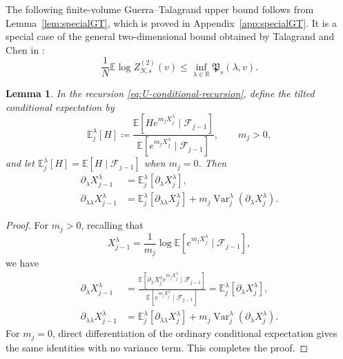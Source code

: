 \documentclass[11pt]{article}
\newtheorem{lemma}[theorem]{Lemma}
\numberwithin{equation}{section}
\newcommand{\E}{\mathbb{E}}
\newcommand{\1}{\mathbf 1}
\newcommand{\cK}{\mathcal K}
\begin{document}
The following finite-volume Guerra--Talagrand upper bound follows from Lemma~\ref{lem:specialGT}, which is proved in Appendix~\ref{app:specialGT}. It is a special case of the general two-dimensional bound obtained by Talagrand and Chen in \cite{Talagrand,ChenGT}:
\begin{equation}
 \frac1N\E\log Z^{(2)}_{N,s}(v)
 \le \inf_{\lambda\in \mathbb R} \mathfrak P_s(\lambda,v).
 \label{eq:GTfunctionalbound}
\end{equation}

\begin{lemma}
\label{lem:U-finite-step-derivatives}
In the recursion \eqref{eq:U-conditional-recursion}, define the tilted
conditional expectation by
\[
\E_j^\lambda[H]
\coloneqq
\frac{
\E\left[
H e^{m_jX_j^\lambda}\mid\mathcal F_{j-1}
\right]
}{
\E\left[
e^{m_jX_j^\lambda}\mid\mathcal F_{j-1}
\right]
},
\qquad m_j>0,
\]
and let $\E_j^\lambda[H]=\E[H\mid\mathcal F_{j-1}]$ when $m_j=0$.
Then
\begin{align}
\partial_\lambda X_{j-1}^\lambda
&=
\E_j^\lambda
\left[
\partial_\lambda X_j^\lambda
\right],
\label{eq:U-first-derivative-recursion}\\
\partial_{\lambda\lambda}X_{j-1}^\lambda
&=
\E_j^\lambda
\left[
\partial_{\lambda\lambda}X_j^\lambda
\right]
+
m_j
\operatorname{Var}_j^\lambda
\left(
\partial_\lambda X_j^\lambda
\right).
\label{eq:U-second-derivative-recursion}
\end{align}
\end{lemma}


\begin{proof}
For $m_j>0$, recalling that $$ X_{j-1}^\lambda= \displaystyle\frac1{m_j}\log\E\left[
 e^{m_jX_j^\lambda}\mid\mathcal F_{j-1}\right],$$
 we have 
\begin{align*}
 \partial_\lambda X_{j-1}^\lambda
 &=\frac{
\E\left[
\partial_\lambda X_j^\lambda e^{m_jX_j^\lambda}\mid\mathcal F_{j-1}
\right]
}{
\E\left[
e^{m_jX_j^\lambda}\mid\mathcal F_{j-1}
\right]}
= \E_j^\lambda[\partial_\lambda X_j^\lambda],\\
 \partial_{\lambda\lambda}X_{j-1}^\lambda
 &=\E_j^\lambda[\partial_{\lambda\lambda}X_j^\lambda]
   +m_j\operatorname{Var}_j^\lambda
       (\partial_\lambda X_j^\lambda).
\end{align*}
For $m_j=0$, direct differentiation of the ordinary conditional
expectation gives the same identities with no variance term.  This completes  the proof. 
\end{proof}
\end{document}
